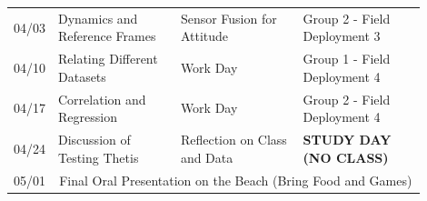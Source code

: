 \documentclass[
	letterpaper, %
	fontsize=10pt, %
	twoside=true, %
	numbers=noenddot, %
]{kaobook}
\begin{document}
\begin{table}[h!]
\begin{tabular}{ c | p{0.3\linewidth} | p{0.3\linewidth} | p{0.3\linewidth} }
        04/03   & Dynamics and Reference Frames     & Sensor Fusion for Attitude        & Group 2 - Field Deployment 3      \\
        04/10   & Relating Different Datasets       & Work Day                          & Group 1 - Field Deployment 4      \\
        04/17   & Correlation and Regression        & Work Day                          & Group 2 - Field Deployment 4      \\
        04/24   & Discussion of Testing Thetis      & Reflection on Class and Data      & \textbf{STUDY DAY (NO CLASS)}     \\
        \hline
        05/01   & \multicolumn{3}{c}{Final Oral Presentation on the Beach (Bring Food and Games)}                           \\
        \bottomrule
    \end{tabular}
\end{table}
\end{document}
